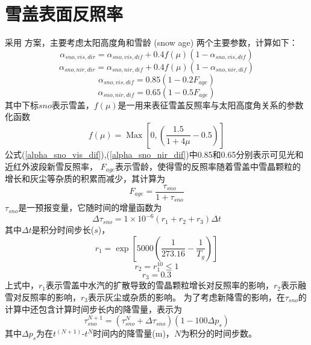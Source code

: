 \section{雪盖表面反照率}
采用 \citet{dickinson1986biosphere} 方案，主要考虑太阳高度角和雪龄 (snow age) 两个主要参数，计算如下：
\begin{equation}
\alpha_{sno, vis, dir}=\alpha_{sno, vis, dif}+0.4 f(\mu)\left(1-\alpha_{sno, vis, dif}\right)
\end{equation}
\begin{equation}
\alpha_{sno,nir,dir}=\alpha_{sno, nir, dif}+0.4 f(\mu)\left(1-\alpha_{sno,nir,dif}\right)
\end{equation}   
\begin{equation}\label{alpha_sno_vis_dif}
\alpha_{sno,vis,dif}=0.85\left(1-0.2 F_{age}\right)
\end{equation}
\begin{equation}\label{alpha_sno_nir_dif}
\alpha_{sno,nir,dif}=0.65\left(1-0.5 F_{age}\right)
\end{equation}
其中下标$sno$表示雪盖，$f(\mu)$是一用来表征雪盖反照率与太阳高度角关系的参数化函数
\begin{equation}\label{fmu}
f(\mu)=\operatorname{Max}\left[0,\left(\frac{1.5}{1+4 \mu}-0.5\right)\right]
\end{equation}
公式(\ref{alpha_sno_vis_dif}),(\ref{alpha_sno_nir_dif})中0.85和0.65分别表示可见光和近红外波段新雪反照率，
$F_{age}$表示雪龄，使得雪的反照率随着雪盖中雪晶颗粒的增长和灰尘等杂质的积累而减少，其计算为
\begin{equation}
F_{a g e}=\frac{\tau_{sno}}{1+\tau_{sno}}
\end{equation}
$\tau_{sno}$是一预报变量，它随时间的增量函数为
\begin{equation}
\Delta \tau_{sno}=1 \times 10^{-6}\left(r_{1}+r_{2}+r_{3}\right) \Delta t
\end{equation}
其中$\Delta t$是积分时间步长($s$)，
\begin{equation}
r_{1}=\exp \left[5000\left(\frac{1}{273.16}-\frac{1}{T_{g}}\right)\right]
\end{equation}
\begin{equation}
r_{2}=r_{1}^{10} \leq 1
\end{equation}
\begin{equation}
r_{3}=0.3
\end{equation}
上式中，$r_1$表示雪盖中水汽的扩散导致的雪晶颗粒增长对反照率的影响，$r_2$表示融雪对反照率的影响，$r_3$表示灰尘或杂质的影响。
为了考虑新降雪的影响，在$\tau_{sno}$的计算中还包含计算时间步长内的降雪量，表示为
\begin{equation}
\tau_{sno}^{N+1}=\left(\tau_{sno}^{N}+\Delta \tau_{sno}\right)\left(1-100 \Delta p_{s}\right)
\end{equation}
其中$\Delta p_{s}$为在$t^(N+1)$-$t^N$时间内的降雪量(m)，$N$为积分的时间步数。



